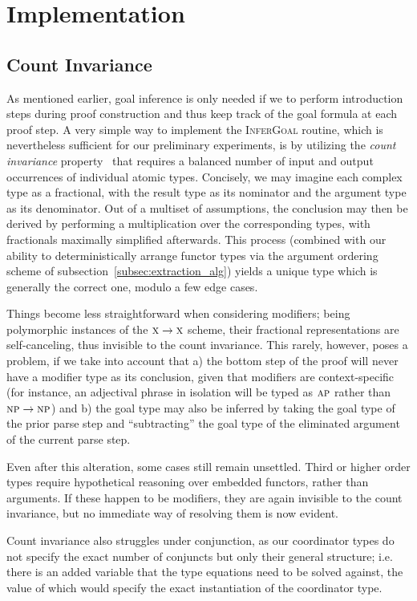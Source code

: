 \section{Implementation}
\subsection{Count Invariance}
As mentioned earlier, goal inference is only needed if we to perform introduction steps during proof construction and thus keep track of the goal formula at each proof step.
A very simple way to implement the \textsc{InferGoal} routine, which is nevertheless sufficient for our preliminary experiments, is by utilizing the  \emph{count invariance} property~\cite{DBLP:journals/jphil/Benthem91} that requires a balanced number of input and output occurrences of individual atomic types.
Concisely, we may imagine each complex type as a fractional, with the result type as its nominator and the argument type as its denominator.
Out of a multiset of assumptions, the conclusion may then be derived by performing a multiplication over the corresponding types, with fractionals maximally simplified afterwards.
This process (combined with our ability to deterministically arrange functor types via the argument ordering scheme of subsection~\ref{subsec:extraction_alg}) yields a unique type which is generally the correct one, modulo a few edge cases.

Things become less straightforward when considering modifiers; being polymorphic instances of the $\textsc{x} \to \textsc{x}$ scheme, their fractional representations are self-canceling, thus invisible to the count invariance.
This rarely, however, poses a problem, if we take into account that a) the bottom step of the proof will never have a modifier type as its conclusion, given that modifiers are context-specific (for instance, an adjectival phrase in isolation will be typed as $\textsc{ap}$ rather than $\textsc{np} \to \textsc{np}$) and b) the goal type may also be inferred by taking the goal type of the prior parse step and ``subtracting'' the goal type of the eliminated argument of the current parse step.

Even after this alteration, some cases still remain unsettled.
Third or higher order types require hypothetical reasoning over embedded functors, rather than arguments.
If these happen to be modifiers, they are again invisible to the count invariance, but no immediate way of resolving them is now evident.

Count invariance also struggles under conjunction, as our coordinator types do not specify the exact number of conjuncts but only their general structure; i.e. there is an added variable that the type equations need to be solved against, the value of which would specify the exact instantiation of the coordinator type. 


